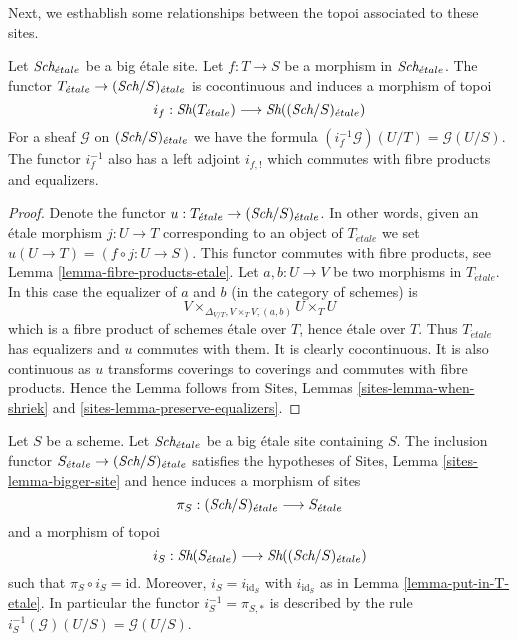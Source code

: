 \noindent
Next, we esthablish some relationships between the topoi
associated to these sites.

\begin{lemma}
\label{lemma-put-in-T-etale}
Let $\textit{Sch}_{\acute{e}tale}$ be a big \'etale site.
Let $f : T \to S$ be a morphism in $\textit{Sch}_{\acute{e}tale}$.
The functor $T_{\acute{e}tale} \to (\textit{Sch}/S)_{\acute{e}tale}$
is cocontinuous and induces a morphism of topoi
$$
i_f :
\mathop{\textit{Sh}}\nolimits(T_{\acute{e}tale})
\longrightarrow
\mathop{\textit{Sh}}\nolimits((\textit{Sch}/S)_{\acute{e}tale})
$$
For a sheaf $\mathcal{G}$ on $(\textit{Sch}/S)_{\acute{e}tale}$
we have the formula $(i_f^{-1}\mathcal{G})(U/T) = \mathcal{G}(U/S)$.
The functor $i_f^{-1}$ also has a left adjoint $i_{f, !}$ which commutes
with fibre products and equalizers.
\end{lemma}

\begin{proof}
Denote the functor $u : T_{\acute{e}tale} \to (\textit{Sch}/S)_{\acute{e}tale}$.
In other words, given an \'etale morphism $j : U \to T$ corresponding
to an object of $T_{\acute{e}tale}$ we set $u(U \to T) = (f \circ j : U \to S)$.
This functor commutes with fibre products, see
Lemma \ref{lemma-fibre-products-etale}.
Let $a, b : U \to V$ be two morphisms in $T_{\acute{e}tale}$.
In this case the equalizer of $a$ and $b$ (in the category of schemes) is
$$
V \times_{\Delta_{V/T}, V \times_T V, (a, b)} U \times_T U
$$
which is a fibre product of schemes \'etale over $T$, hence \'etale
over $T$. Thus $T_{\acute{e}tale}$ has equalizers and $u$ commutes with them.
It is clearly cocontinuous.
It is also continuous as $u$ transforms coverings to coverings and
commutes with fibre products. Hence the Lemma follows from
Sites, Lemmas \ref{sites-lemma-when-shriek}
and \ref{sites-lemma-preserve-equalizers}.
\end{proof}

\begin{lemma}
\label{lemma-at-the-bottom-etale}
Let $S$ be a scheme. Let $\textit{Sch}_{\acute{e}tale}$ be a big \'etale
site containing $S$.
The inclusion functor $S_{\acute{e}tale} \to (\textit{Sch}/S)_{\acute{e}tale}$
satisfies the hypotheses of Sites, Lemma \ref{sites-lemma-bigger-site}
and hence induces a morphism of sites
$$
\pi_S : (\textit{Sch}/S)_{\acute{e}tale} \longrightarrow S_{\acute{e}tale}
$$
and a morphism of topoi
$$
i_S : \mathop{\textit{Sh}}\nolimits(S_{\acute{e}tale}) \longrightarrow \mathop{\textit{Sh}}\nolimits((\textit{Sch}/S)_{\acute{e}tale})
$$
such that $\pi_S \circ i_S = \text{id}$. Moreover, $i_S = i_{\text{id}_S}$
with $i_{\text{id}_S}$ as in Lemma \ref{lemma-put-in-T-etale}.
In particular the functor $i_S^{-1} = \pi_{S, *}$ is described by the rule
$i_S^{-1}(\mathcal{G})(U/S) = \mathcal{G}(U/S)$.
\end{lemma}

